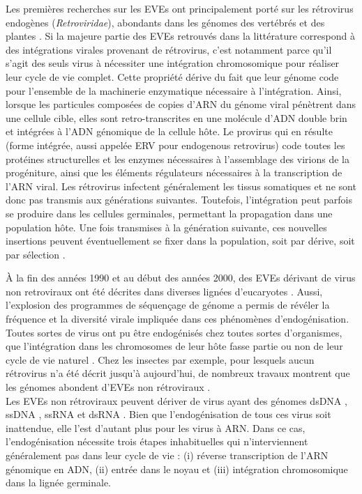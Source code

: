 Les premières recherches sur les EVEs ont principalement porté sur les rétrovirus endogènes (\textit{Retroviridae}), abondants dans les génomes des vertébrés et des plantes \citep{johnson_origins_2019}. Si la majeure partie des EVEs retrouvés dans la littérature correspond à des intégrations virales provenant de rétrovirus, c'est notamment parce qu'il s'agit des seuls virus à nécessiter une intégration chromosomique pour réaliser leur cycle de vie complet. Cette propriété dérive du fait que leur génome code pour l'ensemble de la machinerie enzymatique nécessaire à l'intégration. Ainsi, lorsque les particules composées de copies d'ARN du génome viral pénètrent dans une cellule cible, elles sont retro-transcrites en une molécule d'ADN double brin et intégrées à l'ADN génomique de la cellule hôte. Le provirus qui en résulte (forme intégrée, aussi appelée ERV pour endogenous retrovirus) code toutes les protéines structurelles et les enzymes nécessaires à l'assemblage des virions de la progéniture, ainsi que les éléments régulateurs nécessaires à la transcription de l'ARN viral. Les rétrovirus infectent généralement les tissus somatiques et ne sont donc pas transmis aux générations suivantes.  Toutefois, l'intégration peut parfois se produire dans les cellules germinales, permettant la propagation dans une population hôte. Une fois transmises à la génération suivante, ces nouvelles insertions peuvent éventuellement se fixer dans la population, soit par dérive, soit par sélection \citep{johnson_origins_2019}.   

À la fin des années 1990 et au début des années 2000, des EVEs dérivant de virus non retroviraux ont été décrites dans diverses lignées d'eucaryotes \citep{katzourakis_endogenous_2010,belyi_sequences_2010,liu_widespread_2010}. Aussi, l’explosion des programmes de séquençage de génome a permis de révéler la fréquence et la diversité virale impliquée dans ces phénomènes d’endogénisation. Toutes sortes de virus ont pu être endogénisés chez toutes sortes d'organismes, que l’intégration dans les chromosomes de leur hôte fasse partie ou non de leur cycle de vie naturel \citep{feschotte_endogenous_2012,aiewsakun_endogenous_2015}. Chez les insectes par exemple, pour lesquels aucun rétrovirus n'a été décrit jusqu'à aujourd'hui, de nombreux travaux montrent que les génomes abondent d'EVEs non rétroviraux \citep{gilbert_diversity_2022,cheng_nudivirus_2020,flynn_assessing_2019}.\\

Les EVEs non rétroviraux peuvent dériver de virus ayant des génomes dsDNA \citep{di_giovanni_behavior-manipulating_2020,liu_endogenous_2020,katzourakis_origins_2014}, ssDNA \citep{parker_laterally_2019,gibbs_two_2006}, ssRNA \citep{lequime_discovery_2017,flynn_assessing_2019} et dsRNA \citep{horie_endogenous_2010, katzourakis_endogenous_2010, liu_endogenous_2020}. Bien que l'endogénisation de tous ces virus soit inattendue, elle l'est d'autant plus pour les virus à ARN. Dans ce cas, l'endogénisation nécessite trois étapes inhabituelles qui n'interviennent généralement pas dans leur cycle de vie : (i) réverse transcription de l'ARN génomique en ADN, (ii) entrée dans le noyau et (iii) intégration chromosomique dans la lignée germinale. 


